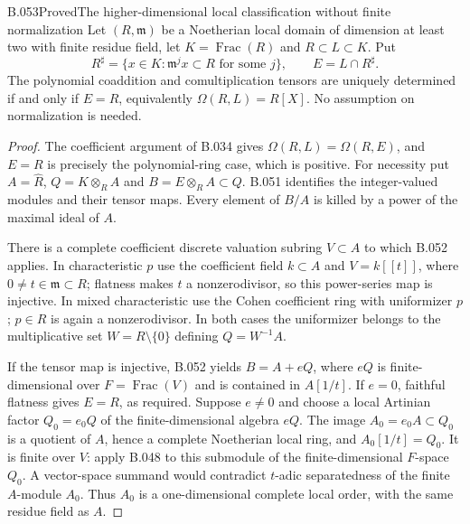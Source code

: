 \begin{saresult}{B.053}{Proved}{The higher-dimensional local classification without finite normalization}
Let $(R,\mathfrak m)$ be a Noetherian local domain
of dimension at least two with finite residue field,
let $K=\operatorname{Frac}(R)$ and $R\subset L\subset K$.
Put
\[
 R^\sharp=\{x\in K:\mathfrak m^jx\subset R
                       \text{ for some }j\},\qquad
 E=L\cap R^\sharp.
\]
The polynomial coaddition and comultiplication
tensors are uniquely determined if and only if
$E=R$, equivalently $\Omega(R,L)=R[X]$.
No assumption on normalization is needed.
\end{saresult}
\begin{proof}
The coefficient argument of B.034 gives
$\Omega(R,L)=\Omega(R,E)$, and $E=R$ is precisely
the polynomial-ring case, which is positive.
For necessity put $A=\widehat R$,
$Q=K\otimes_R A$ and $B=E\otimes_R A\subset Q$.
B.051 identifies the integer-valued modules and
their tensor maps. Every element of $B/A$ is
killed by a power of the maximal ideal of $A$.

There is a complete coefficient discrete valuation
subring $V\subset A$ to which B.052 applies.
In characteristic $p$ use the coefficient field
$k\subset A$ and $V=k[[t]]$, where
$0\ne t\in\mathfrak m\subset R$; flatness makes
$t$ a nonzerodivisor, so this power-series map
is injective. In mixed characteristic use the
Cohen coefficient ring with uniformizer $p$;
$p\in R$ is again a nonzerodivisor. In both
cases the uniformizer belongs to the
multiplicative set $W=R\setminus\{0\}$ defining
$Q=W^{-1}A$.

If the tensor map is injective, B.052 yields
$B=A+eQ$, where $eQ$ is finite-dimensional over
$F=\operatorname{Frac}(V)$ and is contained in
$A[1/t]$. If $e=0$, faithful flatness gives
$E=R$, as required. Suppose $e\ne0$ and choose
a local Artinian factor $Q_0=e_0Q$ of the
finite-dimensional algebra $eQ$.
The image $A_0=e_0A\subset Q_0$ is a quotient
of $A$, hence a complete Noetherian local ring,
and $A_0[1/t]=Q_0$.
It is finite over $V$: apply B.048 to this
submodule of the finite-dimensional $F$-space
$Q_0$. A vector-space summand would contradict
$t$-adic separatedness of the finite $A$-module
$A_0$. Thus $A_0$ is a one-dimensional complete
local order, with the same residue field as $A$.


\end{proof}
